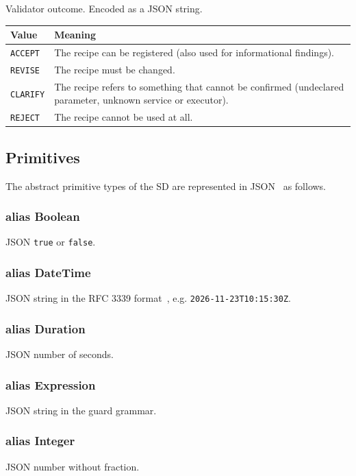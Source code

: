 \documentclass[a4paper]{arrowhead}
\newcommand{\pdef}[1]{{\textcolor{ArrowheadGrey}{#1\label{sec:model:primitives:#1}\label{sec:model:primitives:#1s}}}}
\begin{document}
Validator outcome.
 Encoded as a JSON string.
{\small
\begin{longtable}{|p{3.9cm}|p{11.9cm}|}

\hline
\rowcolor{gray!33} Value & Meaning \\ \hline
\endhead
\texttt{ACCEPT} & The recipe can be registered (also used for informational findings). \\ \hline
\texttt{REVISE} & The recipe must be changed. \\ \hline
\texttt{CLARIFY} & The recipe refers to something that cannot be confirmed (undeclared parameter, unknown service or executor). \\ \hline
\texttt{REJECT} & The recipe cannot be used at all. \\ \hline
\end{longtable}
}


\subsection{Primitives}
\label{sec:model:primitives}
The abstract primitive types of the SD are represented in JSON~\cite{rfc8259} as follows.
\subsubsection*{alias \pdef{Boolean}}
JSON \texttt{true} or \texttt{false}.

\subsubsection*{alias \pdef{DateTime}}
JSON string in the RFC 3339 format~\cite{rfc3339}, e.g. \texttt{2026-11-23T10:15:30Z}.

\subsubsection*{alias \pdef{Duration}}
JSON number of seconds.

\subsubsection*{alias \pdef{Expression}}
JSON string in the guard grammar.

\subsubsection*{alias \pdef{Integer}}
JSON number without fraction.
\end{document}
